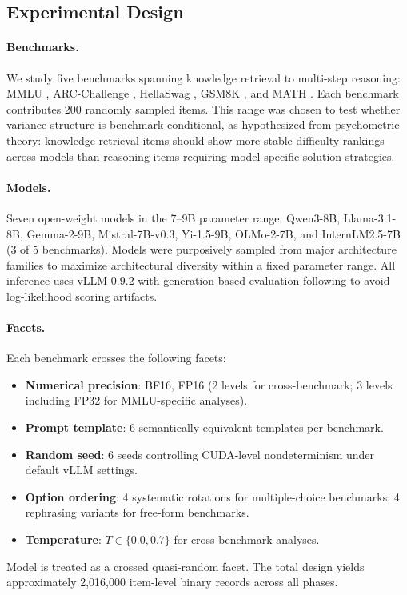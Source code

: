 \documentclass[letterpaper,11pt]{article}
\begin{document}
\subsection{Experimental Design}

\paragraph{Benchmarks.}
We study five benchmarks spanning knowledge retrieval to multi-step reasoning: MMLU \citep{hendrycks2021measuring}, ARC-Challenge \citep{clark2018think}, HellaSwag \citep{zellers2019hellaswag}, GSM8K \citep{cobbe2021training}, and MATH \citep{hendrycks2021math}.
Each benchmark contributes 200 randomly sampled items.
This range was chosen to test whether variance structure is benchmark-conditional, as hypothesized from psychometric theory: knowledge-retrieval items should show more stable difficulty rankings across models than reasoning items requiring model-specific solution strategies.

\paragraph{Models.}
Seven open-weight models in the 7--9B parameter range: Qwen3-8B, Llama-3.1-8B, Gemma-2-9B, Mistral-7B-v0.3, Yi-1.5-9B, OLMo-2-7B, and InternLM2.5-7B (3 of 5 benchmarks).
Models were purposively sampled from major architecture families to maximize architectural diversity within a fixed parameter range.
All inference uses vLLM 0.9.2 with generation-based evaluation following \citet{hua2025emnlp} to avoid log-likelihood scoring artifacts.

\paragraph{Facets.}
Each benchmark crosses the following facets:
\begin{itemize}
    \item \textbf{Numerical precision}: BF16, FP16 (2 levels for cross-benchmark; 3 levels including FP32 for MMLU-specific analyses).
    \item \textbf{Prompt template}: 6 semantically equivalent templates per benchmark.
    \item \textbf{Random seed}: 6 seeds controlling CUDA-level nondeterminism under default vLLM settings.
    \item \textbf{Option ordering}: 4 systematic rotations for multiple-choice benchmarks; 4 rephrasing variants for free-form benchmarks.
    \item \textbf{Temperature}: $T \in \{0.0, 0.7\}$ for cross-benchmark analyses.
\end{itemize}
Model is treated as a crossed quasi-random facet.
The total design yields approximately 2,016,000 item-level binary records across all phases.
\end{document}
